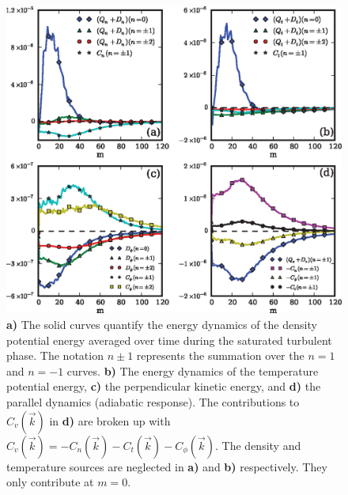 \documentclass[showpacs,preprintnumbers,amsmath,amssymb,superscriptaddress,aip]{revtex4-1}
\begin{document}
\begin{figure}
\includegraphics[]{linear_dynamics}
\hfil
\caption{\textbf{a)} The solid curves quantify the energy dynamics of the density potential energy averaged over time during the saturated turbulent phase. The notation $n \pm 1$ represents the
summation over the $n=1$ and $n=-1$ curves. \textbf{b)} The energy dynamics of the temperature potential energy, \textbf{c)} the perpendicular kinetic energy, and \textbf{d)} the parallel
dynamics (adiabatic response). The contributions to $C_v(\vec{k})$ in \textbf{d)} are broken up with $C_v(\vec{k}) = -C_n(\vec{k}) - C_t(\vec{k}) - C_\phi(\vec{k})$. 
The density and temperature sources are neglected in \textbf{a)} and \textbf{b)} respectively. They only contribute at $m=0$.}
\label{nc_dynamics_figures}
\end{figure}
\end{document}
